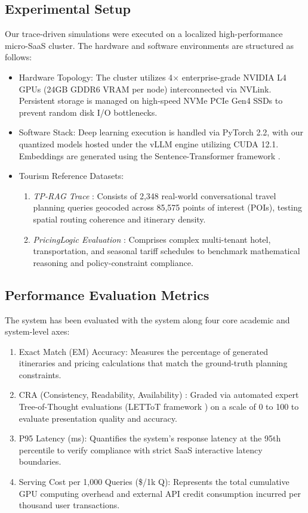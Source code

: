 \documentclass{ieeeaccess}
\begin{document}
\subsection{Experimental Setup}
Our trace-driven simulations were executed on a localized high-performance micro-SaaS cluster. The hardware and software environments are structured as follows:
\begin{itemize}
    \item {Hardware Topology}: The cluster utilizes 4$\times$ enterprise-grade NVIDIA L4 GPUs (24GB GDDR6 VRAM per node) interconnected via NVLink. Persistent storage is managed on high-speed NVMe PCIe Gen4 SSDs to prevent random disk I/O bottlenecks.
    \item {Software Stack}: Deep learning execution is handled via PyTorch 2.2, with our quantized models hosted under the vLLM engine \cite{kwon-pagedattention-2023} utilizing CUDA 12.1. Embeddings are generated using the Sentence-Transformer framework \cite{reimers-sbert-2019}.
    \item {Tourism Reference Datasets}: 
    \begin{enumerate}
        \item \emph{TP-RAG Trace} \cite{ni-tprag-2025}: Consists of 2,348 real-world conversational travel planning queries geocoded across 85,575 points of interest (POIs), testing spatial routing coherence and itinerary density.
        \item \emph{PricingLogic Evaluation} \cite{pricinglogic-2024}: Comprises complex multi-tenant hotel, transportation, and seasonal tariff schedules to benchmark mathematical reasoning and policy-constraint compliance.
    \end{enumerate}
\end{itemize}

\subsection{Performance Evaluation Metrics}
The system has been evaluated with the system along four core academic and system-level axes:
\begin{enumerate}
    \item {Exact Match (EM) Accuracy}: Measures the percentage of generated itineraries and pricing calculations that match the ground-truth planning constraints.
    \item {CRA (Consistency, Readability, Availability)} \cite{tourllm-2024}: Graded via automated expert Tree-of-Thought evaluations (LETToT framework \cite{qi-lettot-2025}) on a scale of 0 to 100 to evaluate presentation quality and accuracy.
    \item {P95 Latency (ms)}: Quantifies the system's response latency at the 95th percentile to verify compliance with strict SaaS interactive latency boundaries.
    \item {Serving Cost per 1,000 Queries (\$/1k Q)}: Represents the total cumulative GPU computing overhead and external API credit consumption incurred per thousand user transactions.
\end{enumerate}
\end{document}
